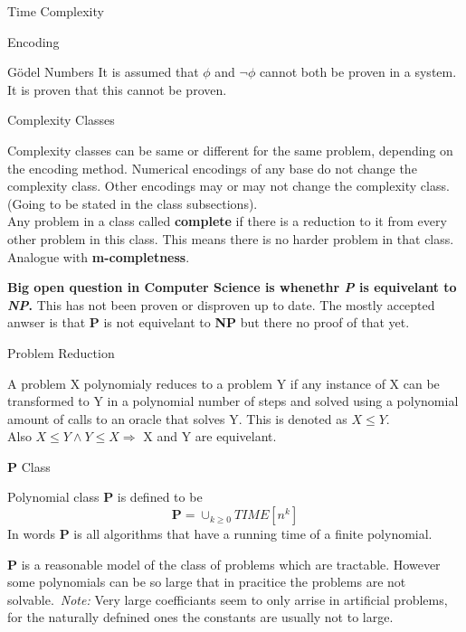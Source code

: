 \documentclass[12pt, letterpaper]{article}
\begin{document}
\begin{section}{Time Complexity}
\begin{subsection}{Encoding}
\begin{subsubsection}{Gödel Numbers}
      It is assumed that \(\phi\) and \(\lnot \phi\) cannot both be proven in a
      system. It is proven that this cannot be proven.
      
    \end{subsubsection}

  \end{subsection}

  \begin{subsection}{Complexity Classes}

    Complexity classes can be same or different for the same problem, depending
    on the encoding method. Numerical encodings of any base do not change the
    complexity class. Other encodings may or may not change the complexity class.
    (Going to be stated in the class subsections). \\
    Any problem in a class called \textbf{complete} if there is a reduction
    to it from every other problem in this class. This means there is no harder
    problem in that class. Analogue with \textbf{m-completness}.

    \textbf{Big open question in Computer Science is whenethr
      \emph{P} is equivelant to \emph{NP}.} This has not been proven
    or disproven up to date. The mostly accepted anwser is that
    \textbf{P} is not equivelant to \textbf{NP} but there no
    proof of that yet.

    \begin{subsubsection}{Problem Reduction}

      A problem X polynomialy reduces to a problem Y if any instance of X can
      be transformed to Y in a polynomial number of steps and solved using
      a polynomial amount of calls to an oracle that solves Y. This is denoted as
      \(X \leq Y\). \\
      Also \(X \leq Y \land Y \leq X \Rightarrow\) X and Y are equivelant.

    \end{subsubsection}

    \begin{subsubsection}{\textbf{P} Class}

      Polynomial class \textbf{P} is defined to be
      \[\textbf{P} = \cup_{k \geq 0} TIME[n^{k}]\]
      In words \textbf{P} is all algorithms that have a running time
      of a finite polynomial.

      \textbf{P} is a reasonable model of the class of problems which are
      tractable. However some polynomials can be so large that in pracitice the
      problems are not solvable.\ \textit{Note:} Very large coefficiants seem to
      only arrise in artificial problems, for the naturally defnined ones the constants
      are usually not to large.


\end{subsubsection}
\end{subsection}
\end{section}
\end{document}
